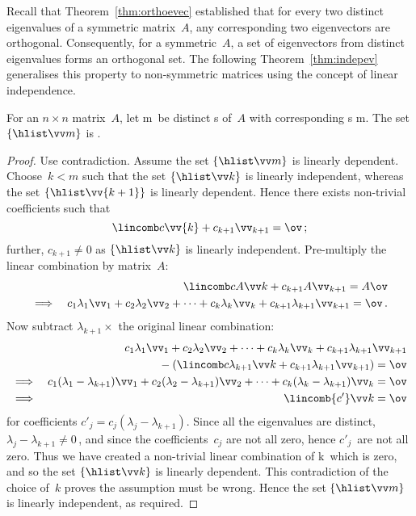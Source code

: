 Recall that Theorem~\ref{thm:orthoevec} established that for every two distinct {eigenvalue}s of a symmetric matrix~\(A\), any corresponding two {eigenvector}s are {orthogonal}.
Consequently, for a symmetric~\(A\), a set of eigenvectors from distinct eigenvalues forms an orthogonal set.
The following Theorem~\ref{thm:indepev} generalises this property to non-symmetric matrices using the concept of linear independence.


\begin{theorem} \label{thm:indepev}
For an \(n\times n\) matrix~\(A\), let \hlist\lambda m\ be distinct s of~\(A\) with corresponding s \hlist\vv m.
The set \(\{\hlist \vv m\}\) is .
\end{theorem}
\begin{proof} 
Use contradiction.
Assume the set \(\{\hlist \vv m\}\) is linearly dependent.
Choose~\(k<m\) such that the set \(\{\hlist\vv k\}\) is linearly independent, whereas the set \(\{\hlist\vv{k+1}\}\) is linearly dependent.
Hence there exists non-trivial coefficients such that 
\begin{equation*}
\lincomb c\vv{k}+c_{k+1}\vv_{k+1}=\ov\,;
\end{equation*}
further, \(c_{k+1}\neq0\) as \(\{\hlist\vv k\}\) is linearly independent.
Pre-multiply the linear combination by matrix~\(A\):
\begin{eqnarray*}&&
\lincomb c{A\vv}k+c_{k+1}A\vv_{k+1}=A\ov
\\\implies&&
c_1\lambda_1\vv_1+c_2\lambda_2\vv_2+\cdots+c_k\lambda_k\vv_k+c_{k+1}\lambda_{k+1}\vv_{k+1}=\ov\,.
\end{eqnarray*}
Now subtract \(\lambda_{k+1}\times\) the original linear combination:
\begin{eqnarray*}&&
\phantom{{}+(}c_1\lambda_1\vv_1+c_2\lambda_2\vv_2+\cdots+c_k\lambda_k\vv_k+c_{k+1}\lambda_{k+1}\vv_{k+1}
\\&&{}
-\left(\lincomb c{\lambda_{k+1}\vv}{k}
+c_{k+1}\lambda_{k+1}\vv_{k+1}\right)=\ov
\\\implies&&
c_1(\lambda_1-\lambda_{k+1})\vv_1+c_2(\lambda_2-\lambda_{k+1})\vv_2+\cdots+c_k(\lambda_k-\lambda_{k+1})\vv_k=\ov
\\\implies&&
\lincomb{c'}\vv k=\ov
\end{eqnarray*}
for coefficients \(c'_j=c_j(\lambda_j-\lambda_{k+1})\).
Since all the eigenvalues are distinct, \(\lambda_j-\lambda_{k+1}\neq0\)\,, and since the coefficients~\(c_j\) are not all zero, hence \(c'_j\)~are not all zero.
Thus we have created a non-trivial linear combination of \hlist \vv k\ which is zero, and so the set \(\{\hlist\vv k\}\) is linearly dependent.
This contradiction of the choice of~\(k\) proves the assumption must be wrong.
Hence the set \(\{\hlist \vv m\}\) is linearly independent, as required.
\end{proof}







